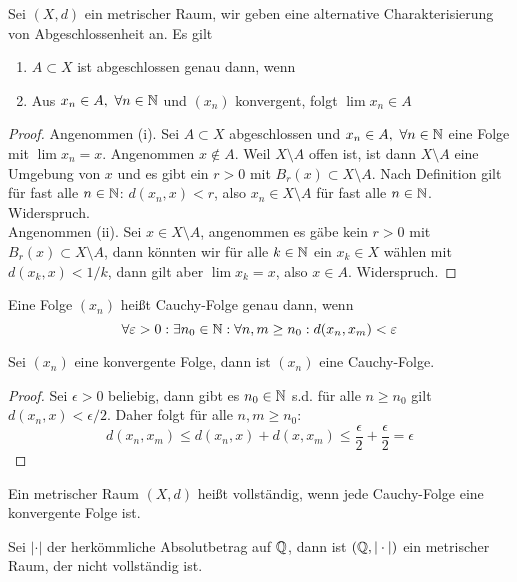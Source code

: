 \begin{lemma}
    Sei $(X,d)$ ein metrischer Raum, wir geben eine alternative Charakterisierung von Abgeschlossenheit an. Es gilt 
    \begin{enumerate}
        \item $A\subset X$ ist abgeschlossen genau dann, wenn 
        \item Aus $x_n\in A, \ \forall n\in \mathbb{N}$ und $(x_n)$ konvergent, folgt $\lim x_n \in A$
    \end{enumerate}    
\end{lemma}
\begin{proof}
    Angenommen (i). Sei $A\subset X$ abgeschlossen und $x_n\in A, \ \forall n\in \mathbb{N}$ eine Folge mit $\lim x_n = x$. Angenommen $x\notin A$. Weil $X\setminus A$ offen ist, ist dann $X\setminus A$ eine Umgebung von $x$ und es gibt ein $r>0$ mit $B_r(x) \subset X\setminus A$. Nach Definition gilt für fast alle $n\in \mathbb{N}$: $d(x_n,x)<r$, also $x_n \in X\setminus A$ für fast alle $n\in \mathbb{N}$. Widerspruch. \\
    Angenommen (ii). Sei $x\in X\setminus A$, angenommen es gäbe kein $r>0$ mit $B_r(x)\subset X\setminus A$, dann könnten wir für alle $k\in \mathbb{N}$ ein $x_k\in X$ wählen mit $d(x_k,x)<1/k$, dann gilt aber $\lim x_k=x$, also $x\in A$. Widerspruch.
\end{proof}
\begin{defn}
    Eine Folge $(x_n)$ heißt Cauchy-Folge genau dann, wenn 
    \[
    \forall \varepsilon > 0 : \exists n_0 \in \mathbb{N}: \forall n,m\ge n_0 : d(x_n,x_m) < \varepsilon    
    \]
\end{defn}
\begin{lemma}
    Sei $(x_n)$ eine konvergente Folge, dann ist $(x_n)$ eine Cauchy-Folge.
\end{lemma}
\begin{proof}
    Sei $\epsilon>0$ beliebig, dann gibt es $n_0\in \mathbb{N}$ s.d. für alle $n\ge n_0$ gilt $d(x_n,x)<\epsilon/2$. Daher folgt für alle $n,m\ge n_0$:
    \[
    d(x_n,x_m) \le d(x_n,x) + d(x,x_m) \le \frac{\epsilon}{2} + \frac{\epsilon}{2} = \epsilon    
    \]
\end{proof}
\begin{defn}
    Ein metrischer Raum $(X,d)$ heißt vollständig, wenn jede Cauchy-Folge eine konvergente Folge ist. 
\end{defn}
\begin{bsp} Sei $\vert\cdot\vert$ der herkömmliche Absolutbetrag auf $\mathbb{Q}$, dann ist $(\mathbb{Q},\vert\cdot\vert)$ ein metrischer Raum, der nicht vollständig ist. 
\end{bsp}
